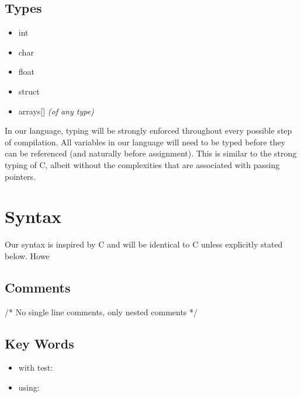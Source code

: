 \documentclass{article}
\begin{document}
\subsection{Types}
\begin{itemize}
	\item int
	\item char
	\item float
	\item struct
	\item arrays[] \textit{(of any type)}
\end{itemize}

In our language, typing will be strongly enforced throughout every possible step of compilation. All variables in our language will need to be typed before they can be referenced (and naturally before assignment). This is similar to the strong typing of C, albeit without the complexities that are associated with passing pointers.
\section{Syntax}
Our syntax is inspired by C and will be identical to C unless explicitly stated below. Howe

\subsection{Comments}

/* No single line comments, only nested comments */

\subsection{Key Words}
\begin{itemize}
	\item
	with test: 
	\item
	using:
\end{itemize}

	
\end{document}
